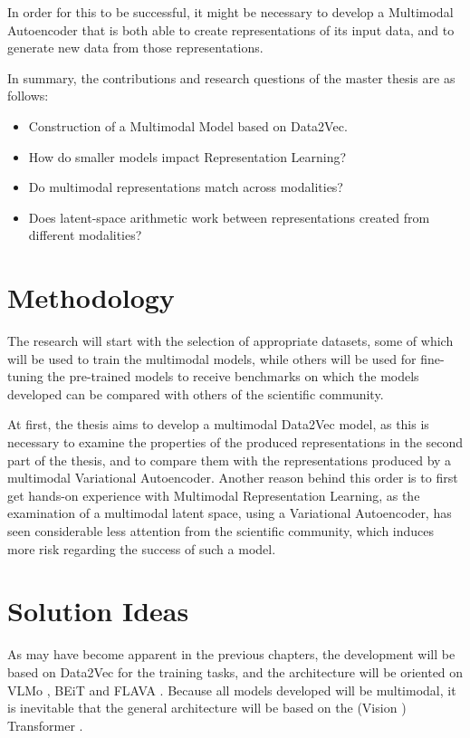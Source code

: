 In order for this to be successful, it might be necessary to develop a Multimodal Autoencoder that is both
able to create representations of its input data, and to generate new data from those representations.

In summary, the contributions and research questions of the master thesis are as follows:

\begin{itemize}
	\item Construction of a Multimodal Model based on Data2Vec.
	\item How do smaller models impact Representation Learning?
    \item Do multimodal representations match across modalities?
	\item Does latent-space arithmetic work between representations created from different modalities?
\end{itemize}

\section{Methodology}
The research will start with the selection of appropriate datasets, some of which will be used to
train the multimodal models, while others will be used for fine-tuning the pre-trained models to receive
benchmarks on which the models developed can be compared with others of the scientific community.

At first, the thesis aims to develop a multimodal Data2Vec model, as this is necessary
to examine the properties of the produced representations in the second part of the thesis, and to compare
them with the representations produced by a multimodal Variational Autoencoder.
Another reason behind this order is to first get hands-on experience with Multimodal Representation Learning,
as the examination of a multimodal latent space, using a Variational Autoencoder, has seen considerable less
attention from the scientific community, which induces more risk regarding the success of such a model.

\section{Solution Ideas}
As may have become apparent in the previous chapters, the development will be based on Data2Vec \cite{baevski}
for the training tasks, and the architecture will be oriented on VLMo \cite{bao}, BEiT \cite{wang} and FLAVA \cite{singh}.
Because all models developed will be multimodal, it is inevitable that the general architecture will be
based on the (Vision \cite{dosovitskiy}) Transformer \cite{vaswani}.

